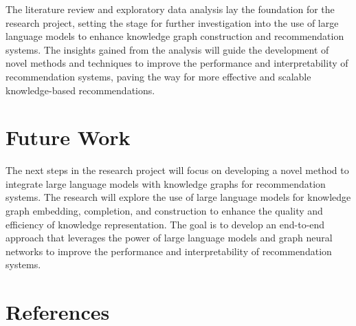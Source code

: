 \documentclass[11pt,a4paper,openany,oneside,titlepage]{article}
\begin{document}
The literature review and exploratory data analysis lay the foundation for the research project, setting the stage for further investigation into the use of large language models to enhance knowledge graph construction and recommendation systems. The insights gained from the analysis will guide the development of novel methods and techniques to improve the performance and interpretability of recommendation systems, paving the way for more effective and scalable knowledge-based recommendations.

\section{Future Work}

The next steps in the research project will focus on developing a novel method to integrate large language models with knowledge graphs for recommendation systems. The research will explore the use of large language models for knowledge graph embedding, completion, and construction to enhance the quality and efficiency of knowledge representation. The goal is to develop an end-to-end approach that leverages the power of large language models and graph neural networks to improve the performance and interpretability of recommendation systems.


\section{References}
\printbibliography[heading=none]
\clearpage

\appendix
\end{document}
